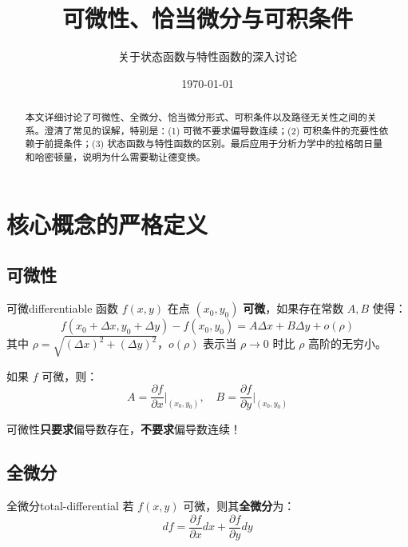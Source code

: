 \documentclass[12pt,a4paper]{article}
\title{\textbf{可微性、恰当微分与可积条件}}
\author{关于状态函数与特性函数的深入讨论}
\date{\today}
\begin{document}
\maketitle

\begin{abstract}
本文详细讨论了可微性、全微分、恰当微分形式、可积条件以及路径无关性之间的关系。澄清了常见的误解，特别是：(1) 可微不要求偏导数连续；(2) 可积条件的充要性依赖于前提条件；(3) 状态函数与特性函数的区别。最后应用于分析力学中的拉格朗日量和哈密顿量，说明为什么需要勒让德变换。
\end{abstract}

\tableofcontents
\newpage

\section{核心概念的严格定义}

\subsection{可微性}

\begin{definition}{可微}{differentiable}
函数 $f(x, y)$ 在点 $(x_0, y_0)$ \textbf{可微}，如果存在常数 $A, B$ 使得：
\begin{equation}
f(x_0 + \Delta x, y_0 + \Delta y) - f(x_0, y_0) = A\Delta x + B\Delta y + o(\rho)
\end{equation}
其中 $\rho = \sqrt{(\Delta x)^2 + (\Delta y)^2}$，$o(\rho)$ 表示当 $\rho \to 0$ 时比 $\rho$ 高阶的无穷小。

如果 $f$ 可微，则：
\begin{equation}
A = \frac{\partial f}{\partial x}\bigg|_{(x_0, y_0)}, \quad B = \frac{\partial f}{\partial y}\bigg|_{(x_0, y_0)}
\end{equation}
\end{definition}

\begin{warning}
可微性\textbf{只要求}偏导数存在，\textbf{不要求}偏导数连续！
\end{warning}

\subsection{全微分}

\begin{definition}{全微分}{total-differential}
若 $f(x, y)$ 可微，则其\textbf{全微分}为：
\begin{equation}
df = \frac{\partial f}{\partial x}dx + \frac{\partial f}{\partial y}dy
\end{equation}
\end{definition}
\end{document}
